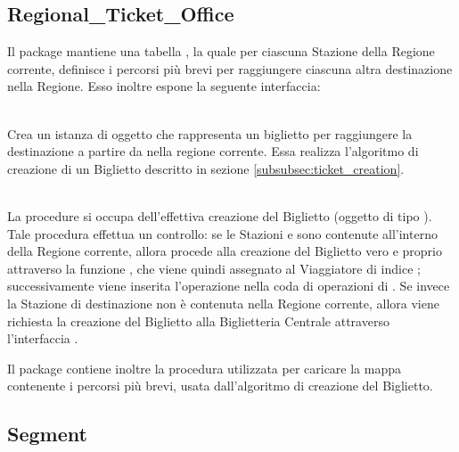 	\subsection{Regional\_Ticket\_Office}
	
	Il package  mantiene una tabella , la quale per ciascuna Stazione della Regione corrente, definisce i percorsi più brevi per raggiungere ciascuna altra destinazione nella Regione. Esso inoltre espone la seguente interfaccia:
	\begin{description}
		\item {} \\
	Crea un istanza di oggetto  che rappresenta un biglietto per raggiungere la destinazione  a partire da  nella regione corrente. Essa realizza l'algoritmo di creazione di un Biglietto descritto in sezione \ref{subsubsec:ticket_creation}.
		\item {} \\
	La procedure si occupa dell'effettiva creazione del Biglietto (oggetto di tipo ). Tale procedura effettua un controllo: se le Stazioni  e  sono contenute all'interno della Regione corrente, allora procede alla creazione del Biglietto vero e proprio attraverso la funzione , che viene quindi assegnato al Viaggiatore di indice ; successivamente viene inserita l'operazione  nella coda di operazioni di . Se invece la Stazione di destinazione  non è contenuta nella Regione corrente, allora viene richiesta la creazione del Biglietto alla Biglietteria Centrale attraverso l'interfaccia .
	\end{description}
	
	Il package  contiene inoltre la procedura  utilizzata per caricare la mappa contenente i percorsi più brevi, usata dall'algoritmo di creazione del Biglietto. 
	
	\subsection{Segment}
	
